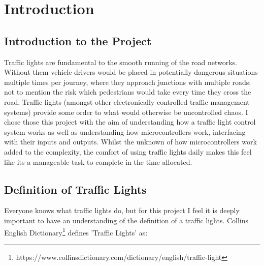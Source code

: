 \chapter{Introduction}

\section{Introduction to the Project}
Traffic lights are fundamental to the smooth running of the road networks. Without them vehicle drivers would be placed in potentially dangerous situations multiple times per journey, where they approach junctions with multiple roads; not to mention the risk which pedestrians would take every time they cross the road. Traffic lights (amongst other electronically controlled traffic management systems) provide some order to what would otherwise be uncontrolled chaos.\newline
I chose those this project with the aim of understanding how a traffic light control system works as well as understanding how microcontrollers work, interfacing with their inputs and outputs. Whilst the unknown of how microcontrollers work added to the complexity, the comfort of using traffic lights daily makes this feel like its a manageable task to complete in the time allocated. 

\section{Definition of Traffic Lights}
Everyone knows what traffic lights do, but for this project I feel it is deeply important to have an understanding of the definition of a traffic lights. \newline
Collins English Dictionary\footnote{https://www.collinsdictionary.com/dictionary/english/traffic-light} defines 'Traffic Lights' as:
